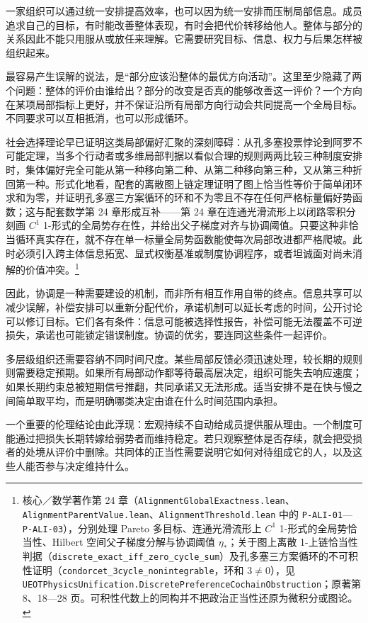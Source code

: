 \documentclass[
  11pt,
  oneside]{book}
\begin{document}
一家组织可以通过统一安排提高效率，也可以因为统一安排而压制局部信息。成员追求自己的目标，有时能改善整体表现，有时会把代价转移给他人。整体与部分的关系因此不能只用服从或放任来理解。它需要研究目标、信息、权力与后果怎样被组织起来。

最容易产生误解的说法，是``部分应该沿整体的最优方向活动''。这里至少隐藏了两个问题：整体的评价由谁给出？部分的改变是否真的能够改善这一评价？一个方向在某项局部指标上更好，并不保证沿所有局部方向行动会共同提高一个全局目标。不同要求可以互相抵消，也可以形成循环。

社会选择理论早已证明这类局部偏好汇聚的深刻障碍：从孔多塞投票悖论到阿罗不可能定理，当多个行动者或多维局部判据以看似合理的规则两两比较三种制度安排时，集体偏好完全可能从第一种移向第二种、从第二种移向第三种，又从第三种折回第一种。形式化地看，配套的离散图上链定理证明了图上恰当性等价于简单闭环求和为零，并证明孔多塞三方案循环的环和不为零且不存在任何严格标量偏好势函数；这与配套数学第 24 章形成互补------第 24 章在连通光滑流形上以闭路零积分刻画 \(C^1\) 1-形式的全局势存在性，并给出父子梯度对齐与协调阈值。只要这种非恰当循环真实存在，就不存在单一标量全局势函数能使每次局部改进都严格爬坡。此时必须引入跨主体信息拓宽、显式权衡基准或制度协调程序，或者坦诚面对尚未消解的价值冲突。\footnote{\hypertarget{ph-note-44}{}核心／数学著作第 24 章（\nolinkurl{AlignmentGlobalExactness.lean}、\nolinkurl{AlignmentParentValue.lean}、\texttt{AlignmentThreshold.lean} 中的 \texttt{P-ALI-01}---\texttt{P-ALI-03}），分别处理 Pareto 多目标、连通光滑流形上 \(C^1\) 1-形式的全局势恰当性、Hilbert 空间父子梯度分解与协调阈值 \(\eta_*\)；关于图上离散 1-上链恰当性判据（\nolinkurl{discrete_exact_iff_zero_cycle_sum}）及孔多塞三方案循环的不可积性证明（\nolinkurl{condorcet_3cycle_nonintegrable}，环和 \(3 \neq 0\)），见 \nolinkurl{UEOTPhysicsUnification.DiscretePreferenceCochainObstruction}；原著第 8、18---28 页。可积性代数上的同构并不把政治正当性还原为微积分或图论。}

因此，协调是一种需要建设的机制，而非所有相互作用自带的终点。信息共享可以减少误解，补偿安排可以重新分配代价，承诺机制可以延长考虑的时间，公开讨论可以修订目标。它们各有条件：信息可能被选择性报告，补偿可能无法覆盖不可逆损失，承诺也可能锁定错误制度。协调的优劣，要连同这些条件一起评价。

多层级组织还需要容纳不同时间尺度。某些局部反馈必须迅速处理，较长期的规则则需要稳定预期。如果所有局部动作都等待最高层决定，组织可能失去响应速度；如果长期约束总被短期信号推翻，共同承诺又无法形成。适当安排不是在快与慢之间简单取平均，而是明确哪类决定由谁在什么时间范围内承担。

一个重要的伦理结论由此浮现：宏观持续不自动给成员提供服从理由。一个制度可能通过把损失长期转嫁给弱势者而维持稳定。若只观察整体是否存续，就会把受损者的处境从评价中删除。共同体的正当性需要说明它如何对待组成它的人，以及这些人能否参与决定维持什么。
\end{document}
